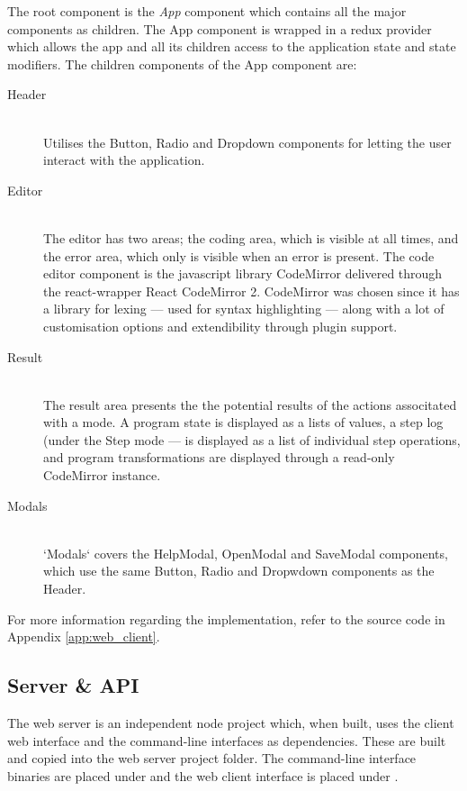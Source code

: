 The root component is the \textit{App} component which contains all the major components as children.
The App component is wrapped in a redux provider which allows the app and all its children access to the application state and state modifiers.
The children components of the App component are:
\begin{description}

  \item[Header]~\\
    Utilises the Button, Radio and Dropdown components for letting the user interact with the application.

  \item[Editor]~\\
    The editor has two areas; the coding area, which is visible at all times, and the error area, which only is visible when an error is present.
    The code editor component is the javascript library CodeMirror \cite{CM} delivered through the react-wrapper React CodeMirror 2.
    CodeMirror was chosen since it has a library for lexing --- used for syntax highlighting --- along with a lot of customisation options and extendibility through plugin support.

  \item[Result]~\\
    The result area presents the the potential results of the actions associtated with a mode. A program state is displayed as a lists of values, a step log (under the Step mode --- is displayed as a list of individual step operations, and program transformations are displayed through a read-only CodeMirror instance.

  \item[Modals]~\\
    `Modals` covers the HelpModal, OpenModal and SaveModal components, which use the same Button, Radio and Dropwdown components as the Header.

\end{description}
For more information regarding the implementation, refer to the source code in Appendix \ref{app:web_client}.



\subsection{Server \& API}
\label{sec:server_and_api}

The web server is an independent node project which, when built, uses the client web interface and the command-line interfaces as dependencies.
These are built and copied into the web server project folder.
The command-line interface binaries are placed under  and the web client interface is placed under .


